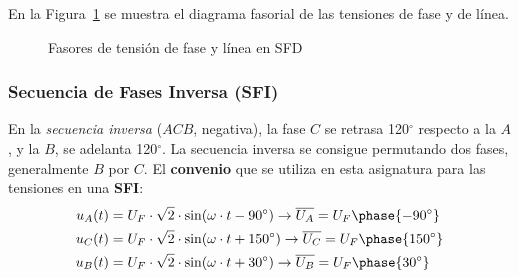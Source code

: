 	En la Figura~\ref{fig.linea-fase-SFD} se muestra el diagrama fasorial de las tensiones de fase y de línea. 
	\begin{figure}[H]
		\centering
		\hfil
		\caption{Fasores de tensión de fase y línea en SFD}
		\label{fig.linea-fase-SFD}
	\end{figure}
	
	\subsubsection{Secuencia de Fases Inversa (SFI)}
	
	En la \textit{secuencia inversa} ($ACB$, negativa), la fase $C$ se retrasa 120$^\circ$ respecto a la $A$, y la $B$, se adelanta 120$^\circ$. La secuencia inversa se consigue permutando dos fases, generalmente $B$ por $C$. El \textbf{convenio} que se utiliza en esta asignatura para las tensiones en una \textbf{SFI}:
	\begin{align*}
		u_{A}(t)&=U_F\cdot\sqrt{2}\cdot \sin(\omega\cdot t-90^\circ)\rightarrow \overline{U_{A}}=U_F\phase {-90^\circ}\\
		u_{C}(t)&=U_F\cdot\sqrt{2}\cdot \sin(\omega\cdot t+150^\circ) \rightarrow \overline{U_{C}}=U_F\phase {150^\circ}\\
		u_{B}(t)&=U_F\cdot\sqrt{2}\cdot \sin(\omega\cdot t+30^\circ)\rightarrow \overline{U_{B}}=U_F\phase {30^\circ}
	\end{align*}
	
